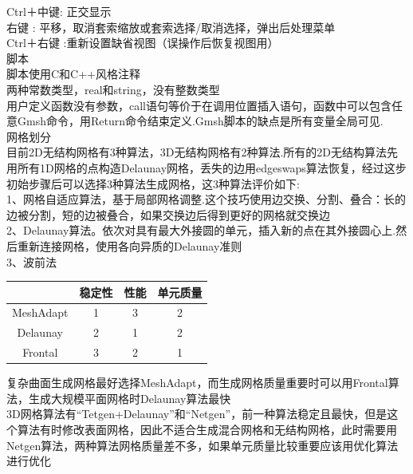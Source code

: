 \documentclass[12pt]{article}
\begin{document}
\begin{CJK}{UTF8}{gkai}
Ctrl＋中键: 正交显示\\

右键 :      平移，取消套索缩放或套索选择/取消选择，弹出后处理菜单\\

Ctrl＋右键 :重新设置缺省视图（误操作后恢复视图用）\\

脚本\\

脚本使用C和C++风格注释\\

两种常数类型，real和string，没有整数类型\\

用户定义函数没有参数，call语句等价于在调用位置插入语句，函数中可以包含任意Gmsh命令，用Return命令结束定义.Gmsh脚本的缺点是所有变量全局可见.\\

网格划分\\

目前2D无结构网格有3种算法，3D无结构网格有2种算法.所有的2D无结构算法先用所有1D网格的点构造Delaunay网格，丢失的边用edgeswaps算法恢复，经过这步初始步骤后可以选择3种算法生成网格，这3种算法评价如下:\\

 1、网格自适应算法，基于局部网格调整.这个技巧使用边交换、分割、叠合：长的边被分割，短的边被叠合，如果交换边后得到更好的网格就交换边\\
 
 2、Delaunay算法。依次对具有最大外接圆的单元，插入新的点在其外接圆心上.然后重新连接网格，使用各向异质的Delaunay准则\\
 
 3、波前法\\

\begin{table}
	\centering
\begin{tabular}{ cccc }   
	\hline
&稳定性& 性能& 单元质量\\
\hline
MeshAdapt   & 1        & 3 &        2\\
Delaunay     &      2    &     1  &       2\\
Frontal       &        3&         2 &        1\\
\hline
\end{tabular}
\end{table}

复杂曲面生成网格最好选择MeshAdapt，而生成网格质量重要时可以用Frontal算法，生成大规模平面网格时Delaunay算法最快\\
3D网格算法有“Tetgen+Delaunay”和“Netgen”，前一种算法稳定且最快，但是这个算法有时修改表面网格，因此不适合生成混合网格和无结构网格，此时需要用Netgen算法，两种算法网格质量差不多，如果单元质量比较重要应该用优化算法进行优化\\


\end{CJK}
\end{document}
